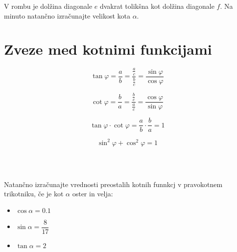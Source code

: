             \begin{naloga}
                V rombu je dolžina diagonale $e$ dvakrat tolikšna kot dolžina diagonale $f$.
                Na minuto natančno izračunajte velikost kota $\alpha$.
            \end{naloga}

        

\newpage



    \section{Zveze med kotnimi funkcijami}

        \begin{multicols}{2}
            $$\displaystyle \tan\varphi=\dfrac{a}{b}=\dfrac{\frac{a}{c}}{\frac{b}{c}}=\dfrac{\sin\varphi}{\cos\varphi}$$
        
            $$\displaystyle \cot\varphi=\dfrac{b}{a}=\dfrac{\frac{b}{c}}{\frac{a}{c}}=\dfrac{\cos\varphi}{\sin\varphi}$$
        
            $$\displaystyle \tan\varphi\cdot\cot\varphi=\dfrac{a}{b}\cdot\dfrac{b}{a}=1$$
        
            $$\sin^2\varphi+\cos^2\varphi =1$$
        \end{multicols}           

        
~\\~\\


        
            \begin{naloga}
                Natančno izračunajte vrednosti preostalih kotnih funnkcj v pravokotnem trikotniku, če je kot $\alpha$ oster in velja:
                \begin{itemize}
                    \item $\cos\alpha=0.1$ 
                    \item $\sin\alpha=\dfrac{8}{17}$ 
                    \item $\tan\alpha=2$ 
                \end{itemize}
            \end{naloga}

        


